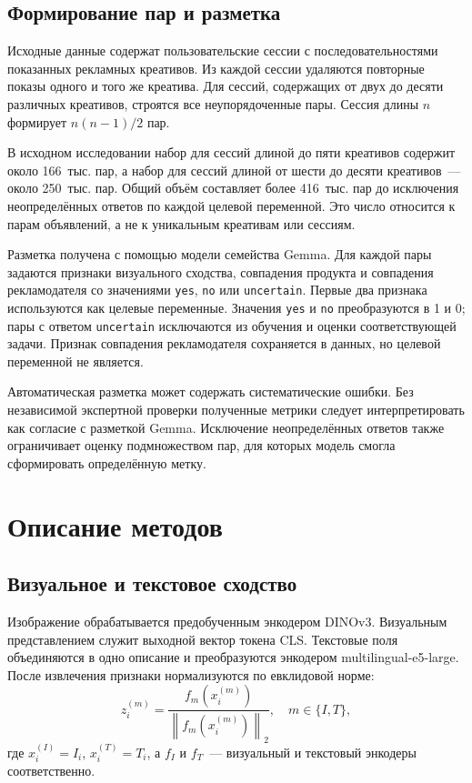 \documentclass{misisarticle}
\begin{document}
\subsection{Формирование пар и разметка}

Исходные данные содержат пользовательские сессии с последовательностями показанных рекламных креативов. Из каждой сессии удаляются повторные показы одного и того же креатива. Для сессий, содержащих от двух до десяти различных креативов, строятся все неупорядоченные пары. Сессия длины $n$ формирует $n(n-1)/2$ пар.

В исходном исследовании набор для сессий длиной до пяти креативов содержит около 166~тыс. пар, а набор для сессий длиной от шести до десяти креативов~--- около 250~тыс. пар. Общий объём составляет более 416~тыс. пар до исключения неопределённых ответов по каждой целевой переменной. Это число относится к парам объявлений, а не к уникальным креативам или сессиям.

Разметка получена с помощью модели семейства Gemma. Для каждой пары задаются признаки визуального сходства, совпадения продукта и совпадения рекламодателя со значениями \texttt{yes}, \texttt{no} или \texttt{uncertain}. Первые два признака используются как целевые переменные. Значения \texttt{yes} и \texttt{no} преобразуются в 1 и 0; пары с ответом \texttt{uncertain} исключаются из обучения и оценки соответствующей задачи. Признак совпадения рекламодателя сохраняется в данных, но целевой переменной не является.

Автоматическая разметка может содержать систематические ошибки. Без независимой экспертной проверки полученные метрики следует интерпретировать как согласие с разметкой Gemma. Исключение неопределённых ответов также ограничивает оценку подмножеством пар, для которых модель смогла сформировать определённую метку.

\section{Описание методов}

\subsection{Визуальное и текстовое сходство}

Изображение обрабатывается предобученным энкодером DINOv3. Визуальным представлением служит выходной вектор токена CLS. Текстовые поля объединяются в одно описание и преобразуются энкодером multilingual-e5-large. После извлечения признаки нормализуются по евклидовой норме:
\begin{equation}
  z_i^{(m)}=\frac{f_m(x_i^{(m)})}
  {\left\|f_m(x_i^{(m)})\right\|_2},
  \quad m\in\{I,T\},
  \label{eq:normalization}
\end{equation}
где $x_i^{(I)}=I_i$, $x_i^{(T)}=T_i$, а $f_I$ и $f_T$~--- визуальный и текстовый энкодеры соответственно.
\end{document}
